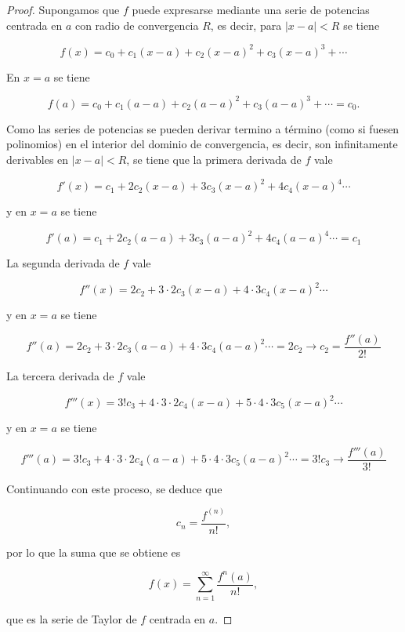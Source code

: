 \documentclass[
  a4paper,
]{scrreport}
\theoremstyle{plain}
\theoremstyle{plain}
\theoremstyle{definition}
\theoremstyle{definition}
\theoremstyle{plain}
\theoremstyle{remark}
\begin{document}
\begin{tcolorbox}[enhanced jigsaw, breakable, bottomrule=.15mm, coltitle=black, bottomtitle=1mm, opacityback=0, title=\textcolor{quarto-callout-note-color}{\faInfo}\hspace{0.5em}{Demostración}, left=2mm, toptitle=1mm, toprule=.15mm, opacitybacktitle=0.6, colframe=quarto-callout-note-color-frame, arc=.35mm, colback=white, rightrule=.15mm, titlerule=0mm, leftrule=.75mm, colbacktitle=quarto-callout-note-color!10!white]

\begin{proof}

Supongamos que \(f\) puede expresarse mediante una serie de potencias
centrada en \(a\) con radio de convergencia \(R\), es decir, para
\(|x-a|<R\) se tiene

\[
f(x) = c_0 + c_1(x-a) + c_2(x-a)^2 + c_3(x-a)^3 + \cdots
\]

En \(x=a\) se tiene

\[
f(a) = c_0 + c_1(a-a) + c_2(a-a)^2 + c_3(a-a)^3 + \cdots = c_0.
\]

Como las series de potencias se pueden derivar termino a término (como
si fuesen polinomios) en el interior del dominio de convergencia, es
decir, son infinitamente derivables en \(|x−a|<R\), se tiene que la
primera derivada de \(f\) vale

\[
f'(x) = c_1 + 2c_2(x-a) + 3c_3(x-a)^2 + 4c_4(x-a)^4 \cdots
\]

y en \(x=a\) se tiene

\[
f'(a) = c_1 + 2c_2(a-a) + 3c_3(a-a)^2 + 4c_4(a-a)^4 \cdots = c_1
\]

La segunda derivada de \(f\) vale

\[
f''(x) = 2c_2 + 3\cdot 2 c_3(x-a) + 4\cdot 3c_4(x-a)^2 \cdots
\]

y en \(x=a\) se tiene

\[
f''(a) = 2c_2 + 3\cdot 2 c_3(a-a) + 4\cdot 3c_4(a-a)^2 \cdots = 2c_2 \rightarrow c_2 = \frac{f''(a)}{2!}
\]

La tercera derivada de \(f\) vale

\[
f'''(x) = 3!c_3 + 4\cdot 3\cdot 2c_4(x-a)+ 5\cdot 4\cdot 3c_5(x-a)^2 \cdots
\]

y en \(x=a\) se tiene

\[
f'''(a) = 3!c_3 + 4\cdot 3\cdot 2c_4(a-a)+ 5\cdot 4\cdot 3c_5(a-a)^2 \cdots = 3!c_3 \rightarrow \frac{f'''(a)}{3!}
\]

Continuando con este proceso, se deduce que

\[
c_n = \frac{f^{(n)}}{n!},
\]

por lo que la suma que se obtiene es

\[
f(x) = \sum_{n=1}^\infty \frac{f^{n}(a)}{n!},
\]

que es la serie de Taylor de \(f\) centrada en \(a\).

\end{proof}

\end{tcolorbox}
\end{document}
